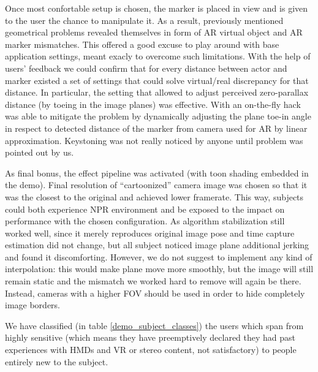 Once most confortable setup is chosen, the marker is placed in view and is given to the user the chance to manipulate it. As a result, previously mentioned geometrical problems revealed themselves in form of AR virtual object and AR marker mismatches. This offered a good excuse to play around with base application settings, meant exacly to overcome such limitations. With the help of users' feedback we could confirm that for every distance between actor and marker existed a set of settings that could solve virtual/real discrepancy for that distance. In particular, the setting that allowed to adjust perceived zero-parallax distance (by toeing in the image planes) was effective. With an on-the-fly hack was able to mitigate the problem by dynamically adjusting the plane toe-in angle in respect to detected distance of the marker from camera used for AR by linear approximation. Keystoning was not really noticed by anyone until problem was pointed out by us.

As final bonus, the effect pipeline was activated (with toon shading embedded in the demo). Final resolution of “cartoonized” camera image was chosen so that it was the closest to the original and achieved lower framerate. This way, subjects could both experience NPR environment and be exposed to the impact on performance with the chosen configuration. As algorithm stabilization still worked well, since it merely reproduces original image pose and time capture estimation did not change, but all subject noticed image plane additional jerking and found it discomforting. However, we do not suggest to implement any kind of interpolation: this would make plane move more smoothly, but the image will still remain static and the mismatch we worked hard to remove will again be there. Instead, cameras with a higher FOV should be used in order to hide completely image borders.

We have classified (in table \ref{demo_subject_classes}) the users which span from highly sensitive (which means they have preemptively declared they had past experiences with HMDs and VR or stereo content, not satisfactory) to people entirely new to the subject.

